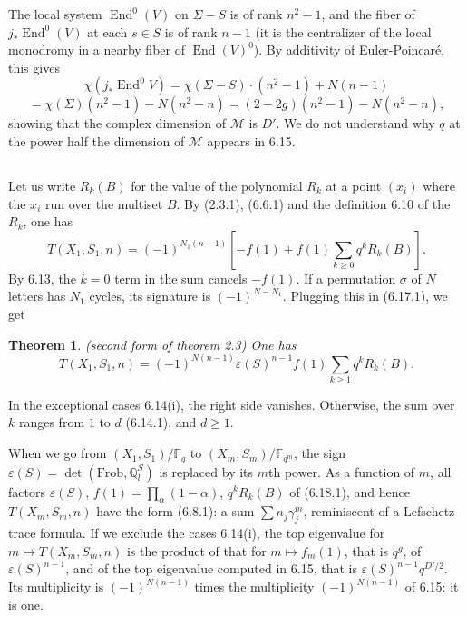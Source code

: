 \documentclass[11pt,a4paper]{article}
\theoremstyle{plain}
\newtheorem{theorem}{Theorem}[section]
\theoremstyle{definition}
\DeclareMathOperator{\End}{End}
\newcommand{\Fq}{\mathbb{F}_q}
\newcommand{\F}{\mathbb{F}}
\newcommand{\Q}{\mathbb{Q}}
\newcommand{\Frob}{\mathrm{Frob}}
\begin{document}
The local system $\End^0(V)$ on $\Sigma - S$ is of rank $n^2 - 1$, and the fiber of $j_* \End^0(V)$ at each $s \in S$ is of rank $n - 1$ (it is the centralizer of the local monodromy in a nearby fiber of $\End(V)^0$). By additivity of Euler-Poincar\'e, this gives
\[
\chi(j_* \End^0 V) = \chi(\Sigma - S) \cdot (n^2 - 1) + N(n - 1)
\]
\[
= \chi(\Sigma)(n^2 - 1) - N(n^2 - n) = (2 - 2g)(n^2 - 1) - N(n^2 - n),
\]
showing that the complex dimension of $\mathcal{M}$ is $D'$. We do not understand why $q$ at the power half the dimension of $\mathcal{M}$ appears in 6.15.

\subsection{}
Let us write $R_k(B)$ for the value of the polynomial $R_k$ at a point $(x_i)$ where the $x_i$ run over the multiset $B$. By (2.3.1), (6.6.1) and the definition 6.10 of the $R_k$, one has
\begin{equation}
T(X_1, S_1, n) = (-1)^{N_1(n-1)} [-f(1) + f(1) \sum_{k \geq 0} q^k R_k(B)]. \tag{6.17.1}
\end{equation}
By 6.13, the $k = 0$ term in the sum cancels $-f(1)$. If a permutation $\sigma$ of $N$ letters has $N_1$ cycles, its signature is $(-1)^{N - N_1}$. Plugging this in (6.17.1), we get

\begin{theorem}\label{thm:secondform}
\emph{(second form of theorem 2.3)} One has
\begin{equation}
T(X_1, S_1, n) = (-1)^{N(n-1)} \varepsilon(S)^{n-1} f(1) \sum_{k \geq 1} q^k R_k(B). \tag{6.18.1}
\end{equation}
\end{theorem}

In the exceptional cases 6.14(i), the right side vanishes. Otherwise, the sum over $k$ ranges from $1$ to $d$ (6.14.1), and $d \geq 1$.

When we go from $(X_1, S_1)/\Fq$ to $(X_m, S_m)/\F_{q^m}$, the sign $\varepsilon(S) = \det(\Frob, \Q_l^S)$ is replaced by its $m$th power. As a function of $m$, all factors $\varepsilon(S)$, $f(1) = \prod_\alpha (1 - \alpha)$, $q^k R_k(B)$ of (6.18.1), and hence $T(X_m, S_m, n)$ have the form (6.8.1): a sum $\sum n_j \gamma_j^m$, reminiscent of a Lefschetz trace formula. If we exclude the cases 6.14(i), the top eigenvalue for $m \mapsto T(X_m, S_m, n)$ is the product of that for $m \mapsto f_m(1)$, that is $q^g$, of $\varepsilon(S)^{n-1}$, and of the top eigenvalue computed in 6.15, that is $\varepsilon(S)^{n-1} q^{D'/2}$. Its multiplicity is $(-1)^{N(n-1)}$ times the multiplicity $(-1)^{N(n-1)}$ of 6.15: it is one.
\end{document}
